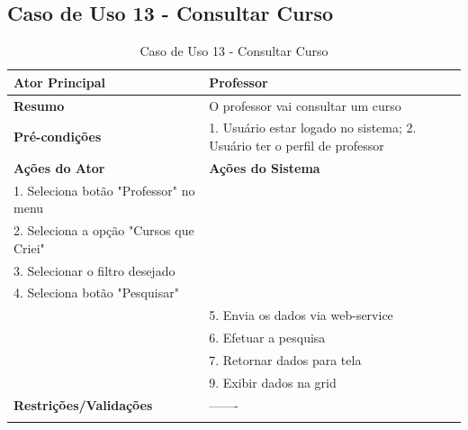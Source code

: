 \subsection{Caso de Uso 13 - Consultar Curso}
\label{sc:case13}
\begin{center}
\begin{longtable}{p{8cm}|p{8cm}}
    \hline
    \textbf{Ator Principal} & Professor \\
    \hline
    \textbf{Resumo} & O professor vai consultar um curso \\
    \hline
    \textbf{Pr\'{e}-condi\c{c}\~{o}es} & 1. Usuário estar logado no sistema; 2. Usuário ter o perfil de professor \\
    \hline
    \textbf{A\c{c}\~{o}es do Ator} & \textbf{A\c{c}\~{o}es do Sistema} \\
    \hline
    1. Seleciona botão "Professor" no menu \\
    \hline
    2. Seleciona a opção "Cursos que Criei" \\
	\hline
    3. Selecionar o filtro desejado \\
	\hline
    4. Seleciona botão "Pesquisar" \\
    \hline
    & 5. Envia os dados via web-service \\
	\hline
    & 6. Efetuar a pesquisa \\
	\hline
    & 7. Retornar dados para tela \\
	\hline
    & 9. Exibir dados na grid \\
    \hline
    \hline
    \textbf{Restri\c{c}\~{o}es/Valida\c{c}\~{o}es} & -------\\
\hline
\caption{Caso de Uso 13 - Consultar Curso}
\end{longtable}
\end{center}


